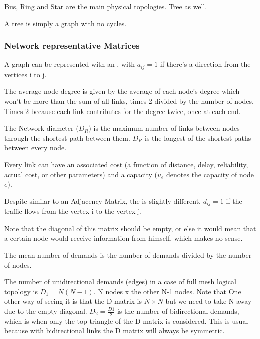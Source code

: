 Bus, Ring and Star are the main physical topologies. Tree as well.

A tree is simply a graph with no cycles.

\subsubsection{Network representative Matrices}

A graph can be represented with an , with $a_{ij} = 1$ if there's a direction from the vertices i to j.

The average node degree is given by the average of each node's degree which won't be more than the sum of all links, times 2 divided by the number of nodes. Times 2 because each link contributes for the degree twice, once at each end.



The Network diameter ($D_R$) is the maximum number of links between nodes through the shortest path between them. $D_R$ is the longest of the shortest paths between every node.


Every link can have an associated cost (a function of distance, delay, reliability, actual cost, or other parameters) and a capacity ($u_e$ denotes the capacity of node $e$).



Despite similar to an Adjacency Matrix, the  is slightly different. $d_{ij} = 1$ if the traffic flows from the vertex i to the vertex j.

Note that the diagonal of this matrix should be empty, or else it would mean that a certain node would receive information from himself, which makes no sense.

The mean number of demands is the number of demands divided by the number of nodes.


The number of unidirectional demands (edges) in a case of full mesh logical topology is $D_1  = N (N-1)$. N nodes x the other N-1 nodes. Note that 
One other way of seeing it is that the D matrix is $N \times N$ but we need to take N away due to the empty diagonal. $D_2 = \frac{D1}{2}$ is the number of bidirectional demands, which is when only the top triangle of the D matrix is considered. This is usual because with bidirectional links the D matrix will always be symmetric.



